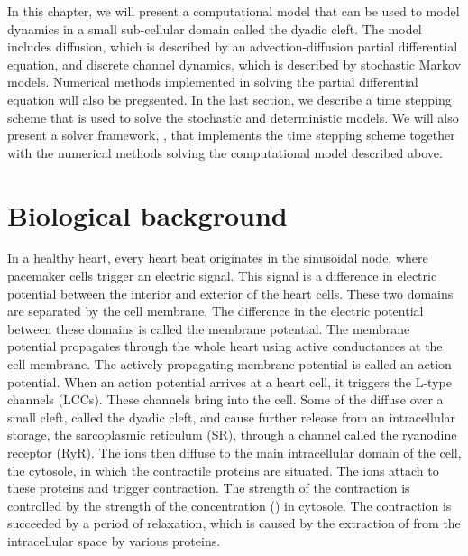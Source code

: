 In this chapter, we will present a computational model that can be used to model \Ca dynamics in a small sub-cellular domain called the dyadic cleft. The model includes \Ca diffusion, which is described by an advection-diffusion partial differential equation, and discrete channel dynamics, which is described by stochastic Markov models. Numerical methods implemented in \pydolfin solving the partial differential equation will also be pregsented. In the last section, we describe a time stepping scheme that is used to solve the stochastic and deterministic models. We will also present a solver framework, \diffsim, that implements the time stepping scheme together with the numerical methods solving the computational model described above.\par

\section{Biological background}
In a healthy heart, every heart beat originates in the sinusoidal node, where pacemaker cells trigger an electric signal. This signal is a difference in electric potential between the interior and exterior of the heart cells. These two domains are separated by the cell membrane. The difference in the electric potential between these domains is called the membrane potential. The membrane potential propagates through the whole heart using active conductances at the cell membrane. The actively propagating membrane potential is called an action potential. When an action potential arrives at a heart cell, it triggers the L-type \Ca channels (LCCs). These channels bring \Ca into the cell. Some of the \Ca diffuse over a small cleft, called the dyadic cleft, and cause further \Ca release from an intracellular \Ca storage, the sarcoplasmic reticulum (SR), through a channel called the ryanodine receptor (RyR). The \Ca ions then diffuse to the main intracellular domain of the cell, the cytosole, in which the contractile proteins are situated. The \Ca ions attach to these proteins and trigger contraction. The strength of the contraction is controlled by the strength of the \Ca concentration (\CaC) in cytosole. The contraction is succeeded by a period of relaxation, which is caused by the extraction of \Ca from the intracellular space by various proteins. \par

